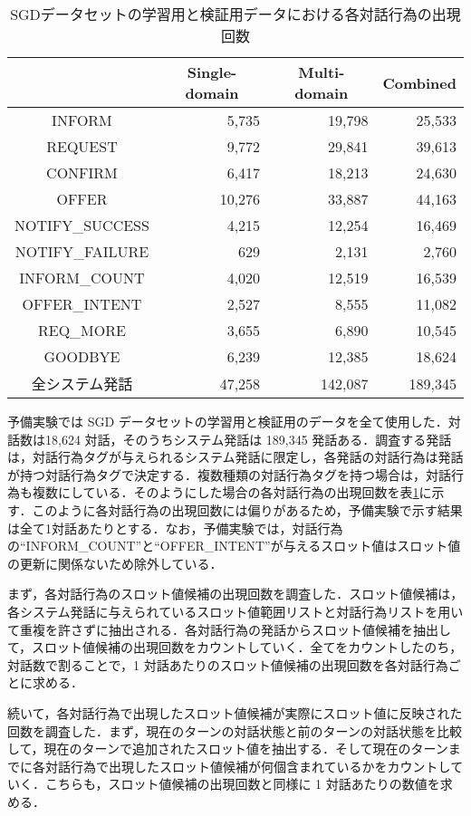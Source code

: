 \begin{table}[htb]
    \centering
    \caption{SGDデータセットの学習用と検証用データにおける各対話行為の出現回数}
    \label{tab:action}
    \vspace{3mm}
    \begin{tabular}{|c|r|r|r|} \hline
        & \multicolumn{1}{c|}{Single-domain} & \multicolumn{1}{c|}{Multi-domain} & \multicolumn{1}{c|}{Combined} \\ \hline
        INFORM & 5,735 & 19,798 & 25,533 \\ \hline
        REQUEST & 9,772 & 29,841 & 39,613 \\ \hline
        CONFIRM & 6,417 & 18,213 & 24,630 \\ \hline
        OFFER & 10,276 & 33,887 & 44,163 \\ \hline
        NOTIFY\_SUCCESS & 4,215 & 12,254 & 16,469 \\ \hline
        NOTIFY\_FAILURE & 629 & 2,131 & 2,760 \\ \hline
        INFORM\_COUNT & 4,020 & 12,519 & 16,539 \\ \hline
        OFFER\_INTENT & 2,527 & 8,555 & 11,082 \\ \hline
        REQ\_MORE & 3,655 & 6,890 & 10,545 \\ \hline
        GOODBYE & 6,239 & 12,385 & 18,624 \\ \hline
        全システム発話 & 47,258 & 142,087 & 189,345 \\ \hline
    \end{tabular}
\end{table}

予備実験では SGD データセットの学習用と検証用のデータを全て使用した．対話数は18,624 対話，そのうちシステム発話は 189,345 発話ある．調査する発話は，対話行為タグが与えられるシステム発話に限定し，各発話の対話行為は発話が持つ対話行為タグで決定する．複数種類の対話行為タグを持つ場合は，対話行為も複数にしている．そのようにした場合の各対話行為の出現回数を表\ref{tab:action}に示す．このように各対話行為の出現回数には偏りがあるため，予備実験で示す結果は全て1対話あたりとする．なお，予備実験では，対話行為の“INFORM\_COUNT”と“OFFER\_INTENT”が与えるスロット値はスロット値の更新に関係ないため除外している．
\par
まず，各対話行為のスロット値候補の出現回数を調査した．スロット値候補は，各システム発話に与えられているスロット値範囲リストと対話行為リストを用いて重複を許さずに抽出される．各対話行為の発話からスロット値候補を抽出して，スロット値候補の出現回数をカウントしていく．全てをカウントしたのち，対話数で割ることで，1 対話あたりのスロット値候補の出現回数を各対話行為ごとに求める．

\par
続いて，各対話行為で出現したスロット値候補が実際にスロット値に反映された回数を調査した．まず，現在のターンの対話状態と前のターンの対話状態を比較して，現在のターンで追加されたスロット値を抽出する．そして現在のターンまでに各対話行為で出現したスロット値候補が何個含まれているかをカウントしていく．こちらも，スロット値候補の出現回数と同様に 1 対話あたりの数値を求める．